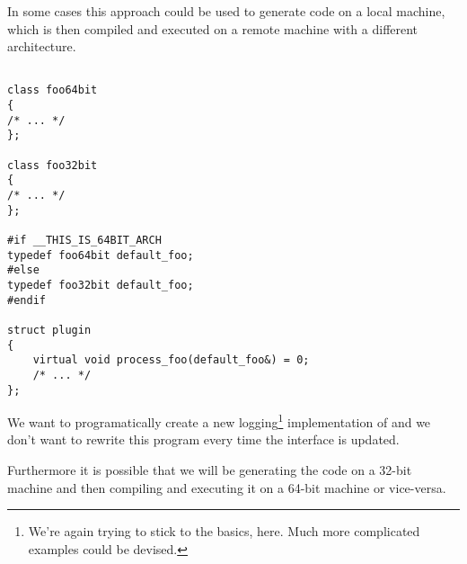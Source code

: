 In some cases this approach could be used to generate code on a local machine,
which is then compiled and executed on a remote machine with a different architecture.

\begin{verbatim}

class foo64bit
{
/* ... */
};

class foo32bit
{
/* ... */
};

#if __THIS_IS_64BIT_ARCH
typedef foo64bit default_foo;
#else
typedef foo32bit default_foo;
#endif

struct plugin
{
	virtual void process_foo(default_foo&) = 0;
	/* ... */
};

\end{verbatim}

We want to programatically create a new logging\footnote{
We're again trying to stick to the basics, here. Much more complicated
examples could be devised.
} implementation of \verb@plugin@
and we don't want to rewrite this program every time
the interface is updated.

Furthermore it is possible that we will be generating the code
on a 32-bit machine and then compiling and executing it on a 64-bit machine
or vice-versa.

